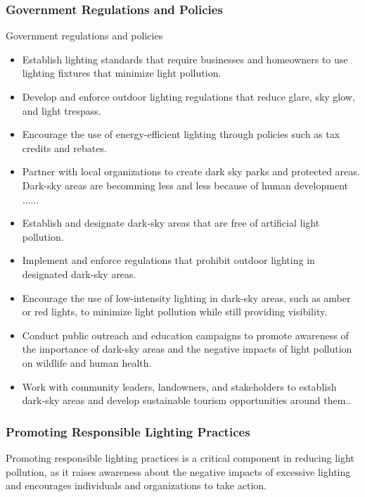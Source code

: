 \subsubsection{Government Regulations and Policies}
Government regulations and policies
\begin{itemize}
    \item Establish lighting standards that require businesses and homeowners to use lighting fixtures that minimize light pollution.
    
    \item Develop and enforce outdoor lighting regulations that reduce glare, sky glow, and light trespass.
    
    \item Encourage the use of energy-efficient lighting through policies such as tax credits and rebates.
    \item Partner with local organizations to create dark sky parks and protected areas.
    Dark-sky areas are becomming less and less because of human development ......

    \item Establish and designate dark-sky areas that are free of artificial light pollution.

    \item Implement and enforce regulations that prohibit outdoor lighting in designated dark-sky areas.

    \item Encourage the use of low-intensity lighting in dark-sky areas, such as amber or red lights, to minimize light pollution while still providing visibility.

    \item Conduct public outreach and education campaigns to promote awareness of the importance of dark-sky areas and the negative impacts of light pollution on wildlife and human health.

    \item Work with community leaders, landowners, and stakeholders to establish dark-sky areas and develop sustainable tourism opportunities around them..
\end{itemize}


\subsubsection{Promoting Responsible Lighting Practices}
Promoting responsible lighting practices is a critical component in reducing light pollution, as it raises awareness about the negative impacts of excessive lighting and encourages individuals and organizations to take action. 

